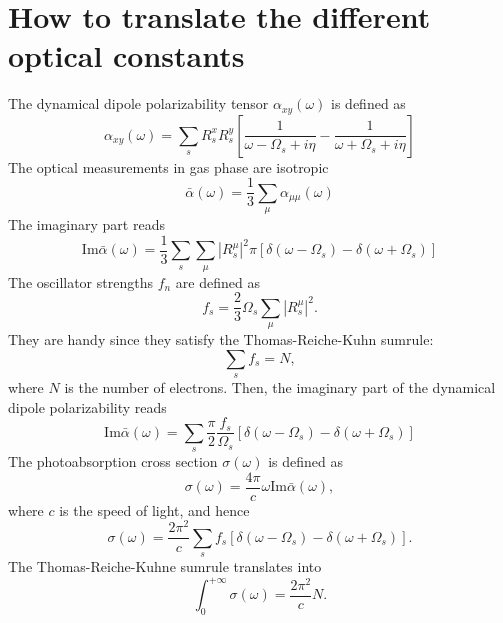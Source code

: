 \documentclass[aps,prb,reprint,showpacs]{revtex4-1}
\begin{document}
\section{How to translate the different optical constants}

The dynamical dipole polarizability tensor $\alpha_{xy}(\omega)$ is defined as
\begin{equation}
 \alpha_{xy}(\omega) = \sum_s R_s^x R_s^y
         \left[ \frac{1}{\omega-\Omega_s + i\eta}
               -\frac{1}{\omega+\Omega_s + i\eta} \right]
\end{equation}
The optical measurements in gas phase are isotropic
\begin{equation}
  \bar \alpha(\omega) = \frac{1}{3} \sum_\mu \alpha_{\mu\mu}(\omega) 
\end{equation}
The imaginary part reads
\begin{equation}
  \mathrm{Im} \bar \alpha(\omega) =  \frac{1}{3} \sum_s \sum_\mu |R_s^\mu|^2 \pi
   \left[ \delta(\omega - \Omega_s) - \delta(\omega + \Omega_s) \right]
\end{equation}
The oscillator strengths $f_n$ are defined as
\begin{equation}
  f_s = \frac{2}{3} \Omega_s \sum_\mu |R_s^\mu|^2 .
\end{equation}
They are handy since they satisfy the Thomas-Reiche-Kuhn sumrule:
\begin{equation}
  \sum_s f_s = N ,
\end{equation}
where $N$ is the number of electrons.
Then, the imaginary part of the dynamical dipole polarizability reads
\begin{equation}
  \mathrm{Im} \bar \alpha(\omega) =  \sum_s \frac{\pi}{2} \frac{f_s}{\Omega_s} 
   \left[ \delta(\omega - \Omega_s) - \delta(\omega + \Omega_s) \right]
\end{equation}
The photoabsorption cross section $\sigma(\omega)$ is defined as
\begin{equation}
  \sigma(\omega) = \frac{4\pi}{c} \omega \mathrm{Im}\bar\alpha(\omega) ,
\end{equation}
where $c$ is the speed of light,
and hence
\begin{equation}
  \sigma(\omega) = \frac{2\pi^2}{c} \sum_s f_s
      \left[ \delta(\omega - \Omega_s) - \delta(\omega + \Omega_s) \right].
\end{equation}
The Thomas-Reiche-Kuhne sumrule translates into
\begin{equation}
 \int_0^{+\infty} \sigma(\omega) = \frac{2\pi^2}{c} N .
\end{equation}
\end{document}
